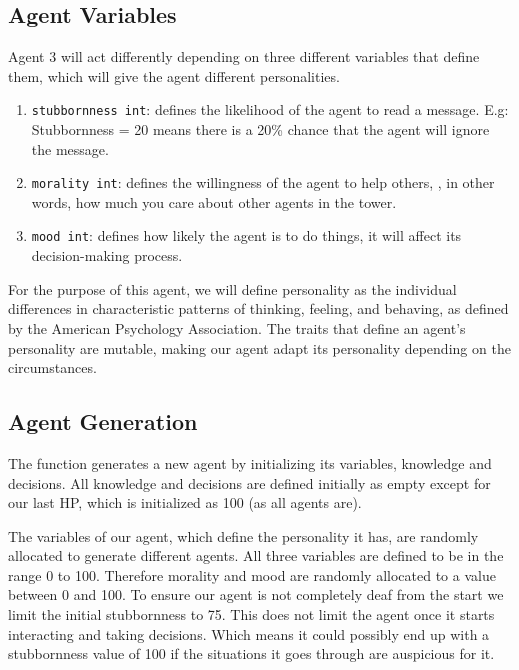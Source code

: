 \subsection{Agent Variables}
Agent 3 will act differently depending on three different variables that define them, which will give the agent different personalities.
\begin{enumerate}
    \item \texttt{stubbornness int}: defines the likelihood of the agent to read a message. E.g: Stubbornness = 20 means there is a 20\% chance that the agent will ignore the message.
    \item \texttt{morality int}: defines the willingness of the agent to help others, \cite{waller_2015}, in other words, how much you care about other agents in the tower. 
    \item \texttt{mood int}: defines how likely the agent is to do things, it will affect its decision-making process.
\end{enumerate}
For the purpose of this agent, we will define personality as the individual differences in characteristic patterns of thinking, feeling, and behaving, as defined by the American Psychology Association. The traits that define an agent's personality are mutable, making our agent adapt its personality depending on the circumstances. 

\subsection{Agent Generation}
The function generates a new agent by initializing its variables, knowledge and decisions. All knowledge and decisions are defined initially as empty except for our last HP, which is initialized as 100 (as all agents are). \par
The variables of our agent, which define the personality it has, are randomly allocated to generate different agents. All three variables are defined to be in the range 0 to 100. Therefore morality and mood are randomly allocated to a value between 0 and 100. To ensure our agent is not completely deaf from the start we limit the initial stubbornness to 75. This does not limit the agent once it starts interacting and taking decisions. Which means it could possibly end up with a stubbornness value of 100 if the situations it goes through are auspicious for it.

